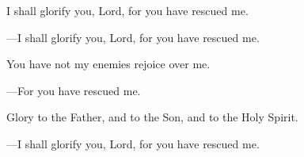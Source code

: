 \responsory

\begin{hangpar}
I shall glorify you, Lord, for you have rescued me.

{\color{red}---\thinspace }I shall glorify you, Lord, for you have rescued me.

\medskip You have not my enemies rejoice over me.

{\color{red}---\thinspace }For you have rescued me.

\medskip Glory to the Father, and to the Son, and to the Holy Spirit.

{\color{red}---\thinspace }I shall glorify you, Lord, for you have rescued me.
\end{hangpar}